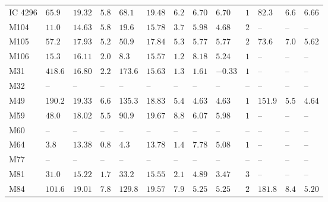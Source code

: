 \begin{table*}
\begin{center}
\begin{tabular}{lllllllllllll}
IC 4296  \quad &  $65.9$  &  $19.32$  &  $5.8$  \quad \quad &  $68.1$  &  $19.48$  &  $6.2$  &  $6.70$  &  $6.70$  \quad \quad &  $1$  \quad \quad &  $82.3$  &  $6.6$  &  $6.66$  \\ 
M104  \quad &  $11.0$  &  $14.63$  &  $5.8$  \quad \quad &  $19.6$  &  $15.78$  &  $3.7$  &  $5.98$  &  $4.68$  \quad \quad &  $2$  \quad \quad &   -- &   -- &   --    \\ 
M105  \quad &  $57.2$  &  $17.93$  &  $5.2$  \quad \quad &  $50.9$  &  $17.84$  &  $5.3$  &  $5.77$  &  $5.77$  \quad \quad &  $2$  \quad \quad &  $73.6$  &  $7.0$  &  $5.62$  \\ 
M106  \quad &  $15.3$  &  $16.11$  &  $2.0$  \quad \quad &  $8.3$  &  $15.57$  &  $1.2$  &  $8.18$  &  $5.24$  \quad \quad &  $1$  \quad \quad &   -- &   -- &   --    \\ 
M31  \quad &  $418.6$  &  $16.80$  &  $2.2$  \quad \quad &  $173.6$  &  $15.63$  &  $1.3$  &  $1.61$  &  $-0.33$  \quad \quad &  $1$  \quad \quad &   -- &   -- &   --    \\ 
M32  \quad &   -- &   -- &   -- \quad \quad &   -- &   -- &   -- &   -- &   -- \quad \quad & 
 -- \quad \quad & 
 -- &   -- &   --    \\ 
M49  \quad &  $190.2$  &  $19.33$  &  $6.6$  \quad \quad &  $135.3$  &  $18.83$  &  $5.4$  &  $4.63$  &  $4.63$  \quad \quad &  $1$  \quad \quad &  $151.9$  &  $5.5$  &  $4.64$  \\ 
M59  \quad &  $48.0$  &  $18.02$  &  $5.5$  \quad \quad &  $90.9$  &  $19.67$  &  $8.8$  &  $6.07$  &  $5.98$  \quad \quad &  $1$  \quad \quad &   -- &   -- &   --    \\ 
M60  \quad &   -- &   -- &   -- \quad \quad &   -- &   -- &   -- &   -- &   -- \quad \quad & 
 -- \quad \quad & 
 -- &   -- &   --    \\ 
M64  \quad &  $3.8$  &  $13.38$  &  $0.8$  \quad \quad &  $4.3$  &  $13.78$  &  $1.4$  &  $7.78$  &  $5.08$  \quad \quad &  $1$  \quad \quad &   -- &   -- &   --    \\ 
M77  \quad &   -- &   -- &   -- \quad \quad &   -- &   -- &   -- &   -- &   -- \quad \quad & 
 -- \quad \quad & 
 -- &   -- &   --    \\ 
M81  \quad &  $31.0$  &  $15.22$  &  $1.7$  \quad \quad &  $33.2$  &  $15.55$  &  $2.1$  &  $4.89$  &  $3.47$  \quad \quad &  $3$  \quad \quad &   -- &   -- &   --    \\ 
M84  \quad &  $101.6$  &  $19.01$  &  $7.8$  \quad \quad &  $129.8$  &  $19.57$  &  $7.9$  &  $5.25$  &  $5.25$  \quad \quad &  $2$  \quad \quad &  $181.8$  &  $8.4$  &  $5.20$  \\ 

\end{tabular}
\end{center}
\end{table*}

